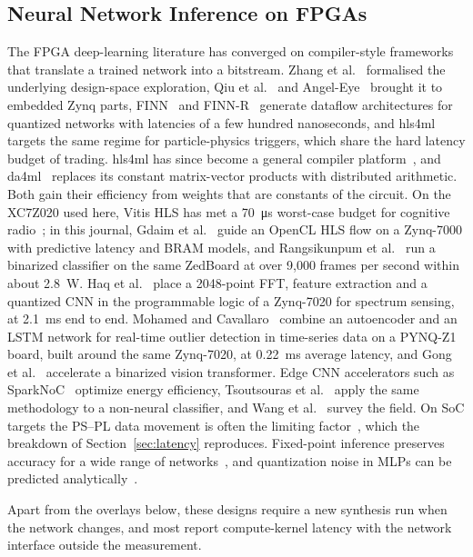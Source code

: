 \documentclass[pdflatex,sn-mathphys-num,iicol]{sn-jnl}
\begin{document}
\subsection{Neural Network Inference on FPGAs}
The FPGA deep-learning literature has converged on compiler-style frameworks
that translate a trained network into a bitstream. Zhang et
al.~\cite{Zhang2015} formalised the underlying design-space exploration, Qiu et
al.~\cite{Qiu2016} and Angel-Eye~\cite{Guo2018} brought it to embedded Zynq
parts, FINN~\cite{Umuroglu2017} and FINN-R~\cite{Blott2018} generate dataflow
architectures for quantized networks with latencies of a few hundred
nanoseconds, and hls4ml~\cite{Duarte2018} targets the same regime for
particle-physics triggers, which share the hard latency budget of trading.
hls4ml has since become a general compiler platform~\cite{Schulte2026}, and
da4ml~\cite{Sun2026} replaces its constant matrix-vector products with
distributed arithmetic. Both gain their efficiency from weights that are
constants of the circuit. On the XC7Z020 used here, Vitis HLS has met a
\SI{70}{\micro\second} worst-case budget for cognitive radio~\cite{deBroglie2024};
in this journal, Gdaim et al.~\cite{Gdaim2026} guide an OpenCL HLS flow on a
Zynq-7000 with predictive latency and BRAM models, and Rangsikunpum et
al.~\cite{Rangsikunpum2026} run a binarized classifier on the same ZedBoard at
over 9{,}000 frames per second within about \SI{2.8}{\watt}. Haq et
al.~\cite{Haq2026} place a 2048-point FFT, feature extraction and a quantized
CNN in the programmable logic of a Zynq-7020 for spectrum sensing, at
\SI{2.1}{\milli\second} end to end. Mohamed and Cavallaro~\cite{Mohamed2023}
combine an autoencoder and an LSTM network for real-time outlier detection in
time-series data on a PYNQ-Z1 board, built around the same Zynq-7020, at
\SI{0.22}{\milli\second} average latency, and Gong et al.~\cite{Gong2025} accelerate a
binarized vision transformer. Edge CNN
accelerators such as SparkNoC~\cite{sparknoc} optimize energy efficiency,
Tsoutsouras et al.~\cite{Tsoutsouras2017} apply the same methodology to a
non-neural classifier, and Wang et al.~\cite{Wang2019survey} survey the field.
On SoC targets the PS--PL data movement is often the limiting
factor~\cite{RiosNavarro2018}, which the breakdown of Section~\ref{sec:latency}
reproduces. Fixed-point inference preserves accuracy for a wide range of
networks~\cite{Jacob2018,Hubara2017,Gholami2021}, and quantization noise in MLPs
can be predicted analytically~\cite{AlRikabi2024}.

Apart from the overlays below, these designs require a new synthesis run when
the network changes, and most report compute-kernel latency with the network
interface outside the measurement.
\end{document}
